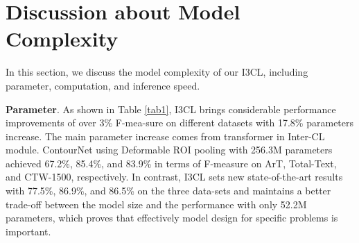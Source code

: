 \begin{table}[ht]
  \caption{Results of I3CL using different tricks with ResNeSt-101 backbone on ArT dataset.}
  \label{tab8}
  \begin{center}
\end{center}
\end{table}


\section{Discussion about Model Complexity}
In this section, we discuss the model complexity of our I3CL, including parameter, computation, and inference speed.

\textbf{Parameter}. As shown in Table \ref{tab1}, I3CL brings considerable performance improvements of over 3\% F-mea-sure on different datasets with 17.8\% parameters increase. The main parameter increase comes from transformer in Inter-CL module. ContourNet \citep{contournet} using Deformable ROI pooling with 256.3M parameters achieved 67.2\%, 85.4\%, and 83.9\% in terms of F-measure on ArT, Total-Text, and CTW-1500, respectively. In contrast, I3CL sets new state-of-the-art results with 77.5\%, 86.9\%, and 86.5\% on the three data-sets and maintains a better trade-off between the model size and the performance with only 52.2M parameters, which proves that effectively model design for specific problems is important.

